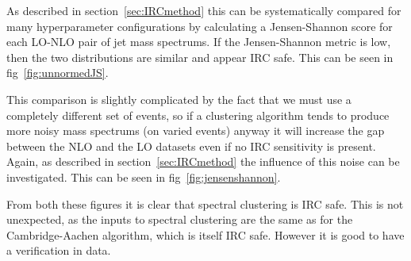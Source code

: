 %
%

As described in section~\ref{sec:IRCmethod} this can be systematically compared for many hyperparameter configurations by calculating a Jensen-Shannon
score for each LO-NLO pair of jet mass spectrums.
If the Jensen-Shannon metric is low, then the two distributions are similar and appear IRC safe.
This can be seen in fig~\ref{fig:unnormedJS}.

This comparison is slightly complicated by the fact that we must use a completely different set of events,
so if a clustering algorithm tends to produce more noisy mass spectrums (on varied events)
anyway it will increase the gap between the NLO and the LO datasets even if no IRC sensitivity is present.
Again, as described in section~\ref{sec:IRCmethod} the influence of this noise can be investigated.
This can be seen in fig~\ref{fig:jensenshannon}.

From both these figures it is clear that spectral clustering is IRC safe.
This is not unexpected, as the inputs to spectral clustering
are the same as for the Cambridge-Aachen algorithm, 
which is itself IRC safe.
However it is good to have a verification in data.

